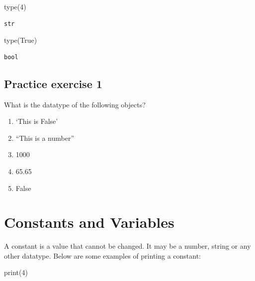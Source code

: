 \documentclass[
  letterpaper,
  DIV=11,
  numbers=noendperiod]{scrreprt}
\newenvironment{Shaded}{\begin{snugshade}}{\end{snugshade}}
\newcommand{\BuiltInTok}[1]{\textcolor[rgb]{0.00,0.23,0.31}{#1}}
\newcommand{\DecValTok}[1]{\textcolor[rgb]{0.68,0.00,0.00}{#1}}
\newcommand{\NormalTok}[1]{\textcolor[rgb]{0.00,0.23,0.31}{#1}}
\newcommand{\StringTok}[1]{\textcolor[rgb]{0.13,0.47,0.30}{#1}}
\newcommand{\VariableTok}[1]{\textcolor[rgb]{0.07,0.07,0.07}{#1}}
\begin{document}
\begin{Shaded}
\begin{Highlighting}[]
\BuiltInTok{type}\NormalTok{(}\StringTok{\textquotesingle{}4\textquotesingle{}}\NormalTok{)}
\end{Highlighting}
\end{Shaded}

\begin{verbatim}
str
\end{verbatim}

\begin{Shaded}
\begin{Highlighting}[]
\BuiltInTok{type}\NormalTok{(}\VariableTok{True}\NormalTok{)}
\end{Highlighting}
\end{Shaded}

\begin{verbatim}
bool
\end{verbatim}

\hypertarget{practice-exercise-1}{%
\subsection{Practice exercise 1}\label{practice-exercise-1}}

What is the datatype of the following objects?

\begin{enumerate}
\def\labelenumi{\arabic{enumi}.}
\item
  `This is False'
\item
  ``This is a number''
\item
  1000
\item
  65.65
\item
  False
\end{enumerate}

\hypertarget{constants-and-variables}{%
\section{Constants and Variables}\label{constants-and-variables}}

A constant is a value that cannot be changed. It may be a number, string
or any other datatype. Below are some examples of printing a constant:

\begin{Shaded}
\begin{Highlighting}[]
\BuiltInTok{print}\NormalTok{(}\DecValTok{4}\NormalTok{)}
\end{Highlighting}
\end{Shaded}
\end{document}

